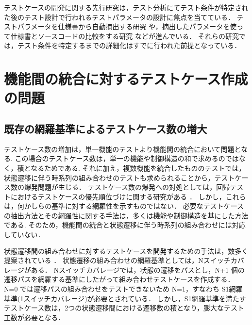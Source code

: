 テストケースの開発に関する先行研究は，テスト分析にてテスト条件が特定された後のテスト設計で行われるテストパラメータの設計に焦点を当てている．
\cite{ammann1994using}
\cite{grochtmann1993classification}
\cite{demillo1978hints}
\cite{lehmann2000test}
テストパラメータを仕様書から自動摘出する研究
\cite{masuda2015semantic}
\cite{masuda2016detecting}
や，摘出したパラメータを使って仕様書とソースコードの比較をする研究
\cite{uetsuki2013efficient}
\cite{uetsuki2017improvement}
\cite{uetsuki2011software}
\cite{uetsuki2012decision}
などが進んでいる．
それらの研究では，テスト条件を特定するまでの詳細化はすでに行われた前提となっている．

\newpage
\section{機能間の統合に対するテストケース作成の問題} \label{sec:2-3}
\subsection{既存の網羅基準によるテストケース数の増大}
テストケース数の増加は，単一機能のテストより機能間の統合において問題となる\cite{rehman2007testing}.
この場合のテストケース数は，単一の機能や制御構造の和で求めるのではなく，積となるためである.
それに加え，複数機能を統合したもののテストでは，状態遷移に伴う時系列の組み合わせのテストも求められることから，テストケース数の爆発問題が生じる．
テストケース数の爆発への対処としては，回帰テストにおけるテストケースの優先順位づけに関する研究がある\cite{rothermel2001prioritizing}
\cite{elbaum2000prioritizing}．
しかし，これらは，何かしらの基準に対する網羅性を示すものではない．
必要なテストケースの抽出方法とその網羅性に関する手法は，多くは機能や制御構造を基にした方法である.
そのため，機能間の統合と状態遷移に伴う時系列の組み合わせには対応していない．

状態遷移間の組み合わせに対するテストケースを開発するための手法は，数多く提案されている
\cite{whittaker1994markov}
\cite{lee1996principles}
\cite{fujiwara1991test}
\cite{andrews2005testing}．
状態遷移の組み合わせの網羅基準としては，Nスイッチカバレージがある．
Nスイッチカバレージでは，状態の遷移をパスとし，N+1 個の遷移パスを網羅する基準にしたがって組み合わせテストケースを作成する\cite{chow1978testing}．
N=0 では遷移パスの組み合わせをテストできないため N=1，すなわち S1網羅基準(1スイッチカバレージ)が必要とされている．
しかし，S1網羅基準を満たすテストケース数は，2つの状態遷移間における遷移数の積となり，膨大なテスト工数が必要となる．

